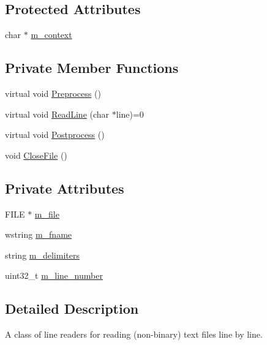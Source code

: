 \subsection*{Protected Attributes}
\begin{DoxyCompactItemize}
\item 
char $\ast$ \hyperlink{classmage_1_1_line_reader_a2f1cfe313dc89741386178e63a6b8b0c}{m\+\_\+context}
\end{DoxyCompactItemize}
\subsection*{Private Member Functions}
\begin{DoxyCompactItemize}
\item 
virtual void \hyperlink{classmage_1_1_line_reader_a4de135cfb0434be786cfcfd7959031ef}{Preprocess} ()
\item 
virtual void \hyperlink{classmage_1_1_line_reader_acfb2f7279ec77d070a86d7db812d4745}{Read\+Line} (char $\ast$line)=0
\item 
virtual void \hyperlink{classmage_1_1_line_reader_adfde21013140a1058d3dd567204abfb5}{Postprocess} ()
\item 
void \hyperlink{classmage_1_1_line_reader_ab2ee825c79432ac1af53eb899fcaeb98}{Close\+File} ()
\end{DoxyCompactItemize}
\subsection*{Private Attributes}
\begin{DoxyCompactItemize}
\item 
F\+I\+LE $\ast$ \hyperlink{classmage_1_1_line_reader_a0bc5f3543a85487fc0e52a6015048476}{m\+\_\+file}
\item 
wstring \hyperlink{classmage_1_1_line_reader_ad6f55ba12fc610ab2fc1c26a48d12321}{m\+\_\+fname}
\item 
string \hyperlink{classmage_1_1_line_reader_a6de3398ac59fdd98f8c40cff6f5c1075}{m\+\_\+delimiters}
\item 
uint32\+\_\+t \hyperlink{classmage_1_1_line_reader_ada0b4ec5817b96c6b1bb43bd2573f8ba}{m\+\_\+line\+\_\+number}
\end{DoxyCompactItemize}


\subsection{Detailed Description}
A class of line readers for reading (non-\/binary) text files line by line. 

